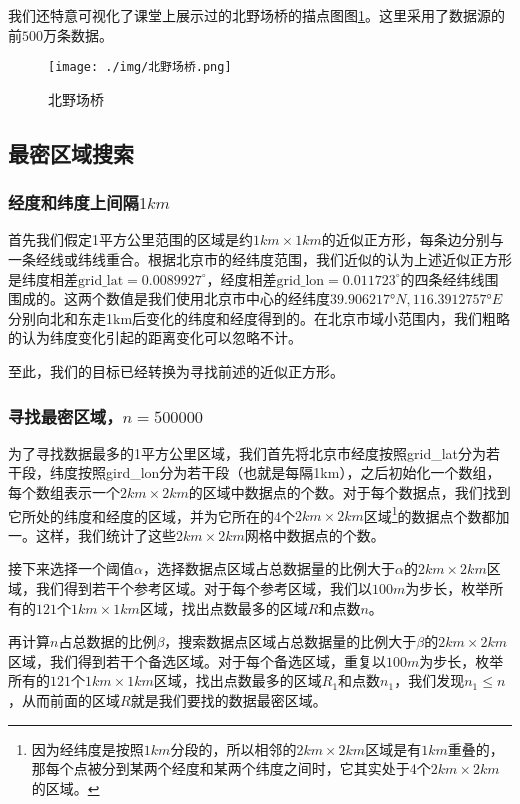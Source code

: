 \documentclass[UTF8]{ctexart}
\begin{document}
我们还特意可视化了课堂上展示过的北野场桥的描点图图\ref{beiyechang}。这里采用了数据源的前$500$万条数据。

\begin{figure}[!htb]
    \centering
    \texttt{[image: ./img/北野场桥.png]}
    \caption{北野场桥}
    \label{beiyechang}
\end{figure}

\subsection{最密区域搜索}

\subsubsection{经度和纬度上间隔$1km$}

首先我们假定1平方公里范围的区域是约$1km\times 1km$的近似正方形，每条边分别与一条经线或纬线重合。根据北京市的经纬度范围，我们近似的认为上述近似正方形是纬度相差$\text{grid\_lat} = 0.0089927^\circ$，经度相差$\text{grid\_lon} = 0.011723^\circ$的四条经纬线围围成的。这两个数值是我们使用北京市中心的经纬度$39.906217°N, 116.3912757°E$分别向北和东走1km后变化的纬度和经度得到的。在北京市域小范围内，我们粗略的认为纬度变化引起的距离变化可以忽略不计。

至此，我们的目标已经转换为寻找前述的近似正方形。

\subsubsection{寻找最密区域，$n=500000$}


为了寻找数据最多的1平方公里区域，我们首先将北京市经度按照grid\_lat分为若干段，纬度按照gird\_lon分为若干段（也就是每隔1km），之后初始化一个数组，每个数组表示一个$2km\times 2km$的区域中数据点的个数。对于每个数据点，我们找到它所处的纬度和经度的区域，并为它所在的4个$2km\times 2km$区域\footnote{因为经纬度是按照$1km$分段的，所以相邻的$2km\times 2km$区域是有$1km$重叠的，那每个点被分到某两个经度和某两个纬度之间时，它其实处于4个$2km\times 2km$的区域。}的数据点个数都加一。这样，我们统计了这些$2km\times 2km$网格中数据点的个数。

接下来选择一个阈值$\alpha$，选择数据点区域占总数据量的比例大于$\alpha$的$2km\times 2km$区域，我们得到若干个参考区域。对于每个参考区域，我们以$100m$为步长，枚举所有的$121$个$1km\times 1km$区域，找出点数最多的区域$R$和点数$n$。

再计算$n$占总数据的比例$\beta$，搜索数据点区域占总数据量的比例大于$\beta$的$2km\times 2km$区域，我们得到若干个备选区域。对于每个备选区域，重复以$100m$为步长，枚举所有的$121$个$1km\times 1km$区域，找出点数最多的区域$R_1$和点数$n_1$，我们发现$n_1\le n$，从而前面的区域$R$就是我们要找的数据最密区域。
\end{document}
